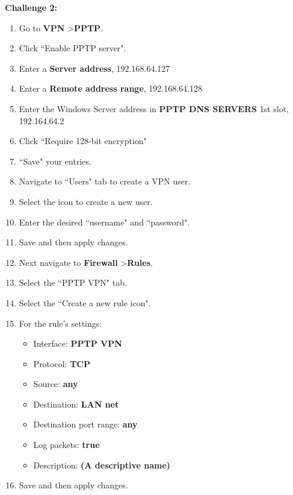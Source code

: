 \documentclass[12pt]{extarticle}
\begin{document}
 

\vspace{4mm}
\textbf{Challenge 2:}
\begin{enumerate}
\item Go to \textbf{VPN} \textgreater \textbf{PPTP}.
\item Click ``Enable PPTP server".
\item Enter a \textbf{Server address}, 192.168.64.127
\item Enter a \textbf{Remote address range}, 192.168.64.128
\item Enter the Windows Server address in \textbf{PPTP DNS SERVERS} 1st slot, 192.164.64.2
\item Click ``Require 128-bit encryption"
\item  ``Save" your entries.

\item Navigate to ``Users" tab to create a VPN user.
\item Select the icon to create a new user.
\item Enter the desired ``username" and ``password".
\item Save and then apply changes.

\item Next navigate to \textbf{Firewall} \textgreater \textbf{Rules}.
\item Select the ``PPTP VPN" tab.
\item Select the ``Create a new rule icon".
\item For the rule's settings:
\begin{itemize}
    \item Interface: \textbf{PPTP VPN}
    \item Protocol: \textbf{TCP}
    \item Source: \textbf{any}
    \item Destination: \textbf{LAN net}
    \item Destination port range: \textbf{any}
    \item Log packets: \textbf{true}
    \item Description: \textbf{(A descriptive name)}
\end{itemize}
\item Save and then apply changes.


\end{enumerate}
\end{document}
